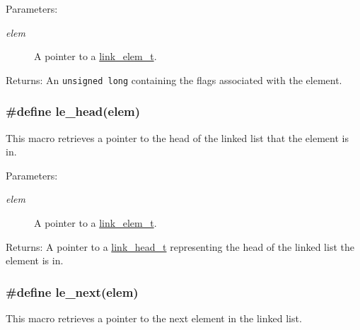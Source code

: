 \begin{Desc}
\item[Parameters:]
\begin{description}
\item[{\em elem}]A pointer to a \hyperlink{group__dbprim__link_a1}{link\_\-elem\_\-t}.\end{description}
\end{Desc}
\begin{Desc}
\item[Returns:]An {\tt unsigned long} containing the flags associated with the element. \end{Desc}
\hypertarget{group__dbprim__link_a24}{
\subsubsection[le\_\-head]{\setlength{\rightskip}{0pt plus 5cm}\#define le\_\-head(elem)}}
\label{group__dbprim__link_a24}


This macro retrieves a pointer to the head of the linked list that the element is in.

\begin{Desc}
\item[Parameters:]
\begin{description}
\item[{\em elem}]A pointer to a \hyperlink{group__dbprim__link_a1}{link\_\-elem\_\-t}.\end{description}
\end{Desc}
\begin{Desc}
\item[Returns:]A pointer to a \hyperlink{group__dbprim__link_a0}{link\_\-head\_\-t} representing the head of the linked list the element is in. \end{Desc}
\hypertarget{group__dbprim__link_a21}{
\subsubsection[le\_\-next]{\setlength{\rightskip}{0pt plus 5cm}\#define le\_\-next(elem)}}
\label{group__dbprim__link_a21}


This macro retrieves a pointer to the next element in the linked list.

